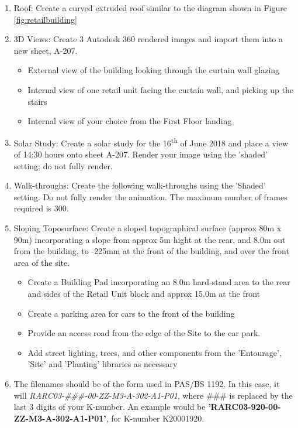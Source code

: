 \begin{enumerate}
	\item Roof: Create a curved extruded roof similar to the diagram shown in Figure \ref{fig:retailbuilding}
	
	\item 3D Views: Create 3 Autodesk 360 rendered images and import them into a new sheet, A-207.
	\begin{itemize}
		\item External view of the building looking through the curtain wall glazing
		\item Internal view of one retail unit facing the curtain wall, and picking up the stairs
		\item Internal view of your choice from the First Floor landing 
	\end{itemize} 
	\item Solar Study: Create a solar study for the 16\textsuperscript{th} of June 2018 and place a view of 14:30 hours onto sheet A-207.  Render your image using the 'shaded' setting; do not fully render.  
	\item Walk-throughs: Create the following walk-throughs using the 'Shaded' setting.  Do not fully render the animation.  The maximum number of frames required is 300.
	\item Sloping Toposurface: Create a sloped topographical surface (approx 80m x 90m) incorporating a slope from approx 5m hight at the rear, and 8.0m out from the building, to -225mm at the front of the building, and over the front area of the site.
	\begin{itemize}
		\item Create a Building Pad incorporating an 8.0m hard-stand area to the rear and sides of the Retail Unit block and approx 15.0m at the front
		\item Create a parking area for cars to the front of the building
		\item Provide an access road from the edge of the Site to the car park.
		\item Add street lighting, trees, and other components from the 'Entourage', 'Site' and 'Planting' libraries as necessary 
	\end{itemize}
	\item The filenames should be of the form used in PAS/BS 1192.  In this case, it will \textit{RARC03-\#\#\#-00-ZZ-M3-A-302-A1-P01}, where \#\#\# is replaced by the last 3 digits of your K-number. An example would be \textbf{'RARC03-920-00-ZZ-M3-A-302-A1-P01'}, for K-number K20001920.
\end{enumerate}


